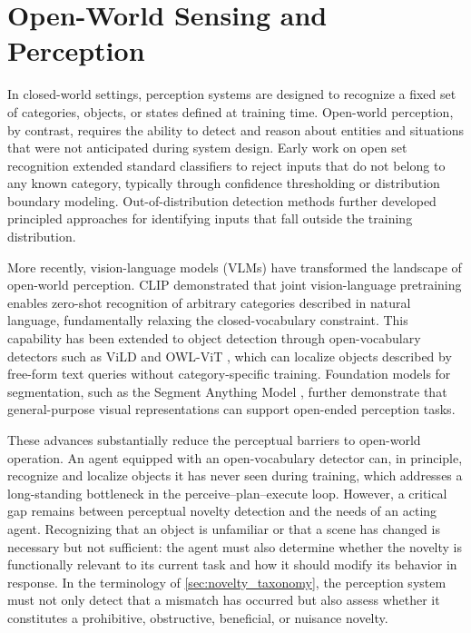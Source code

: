 \section{Open-World Sensing and Perception}
\label{sec:rw_sensing}

In closed-world settings, perception systems are designed to recognize a fixed set of categories, objects, or states defined at training time. Open-world perception, by contrast, requires the ability to detect and reason about entities and situations that were not anticipated during system design. Early work on open set recognition \citep{scheirer2013toward, bendale2016towards} extended standard classifiers to reject inputs that do not belong to any known category, typically through confidence thresholding or distribution boundary modeling. Out-of-distribution detection methods \citep{hendrycks2017baseline} further developed principled approaches for identifying inputs that fall outside the training distribution.

More recently, vision-language models (VLMs) have transformed the landscape of open-world perception. CLIP \citep{radford2021learning} demonstrated that joint vision-language pretraining enables zero-shot recognition of arbitrary categories described in natural language, fundamentally relaxing the closed-vocabulary constraint. This capability has been extended to object detection through open-vocabulary detectors such as ViLD \citep{gu2022openvocabulary} and OWL-ViT \citep{minderer2022simple}, which can localize objects described by free-form text queries without category-specific training. Foundation models for segmentation, such as the Segment Anything Model \citep{kirillov2023segment}, further demonstrate that general-purpose visual representations can support open-ended perception tasks.

These advances substantially reduce the perceptual barriers to open-world operation. An agent equipped with an open-vocabulary detector can, in principle, recognize and localize objects it has never seen during training, which addresses a long-standing bottleneck in the perceive--plan--execute loop. However, a critical gap remains between perceptual novelty detection and the needs of an acting agent. Recognizing that an object is unfamiliar or that a scene has changed is necessary but not sufficient: the agent must also determine whether the novelty is functionally relevant to its current task and how it should modify its behavior in response. In the terminology of \cref{sec:novelty_taxonomy}, the perception system must not only detect that a mismatch has occurred but also assess whether it constitutes a prohibitive, obstructive, beneficial, or nuisance novelty.

